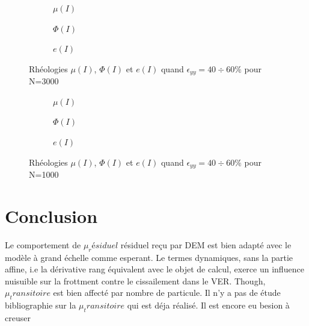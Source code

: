 \documentclass[5p,authoryear,square]{elsarticle}
\begin{document}
\begin{figure}[p]
    \centering
    \begin{subfigure}{0.3\textwidth}
        \centering
        \scalebox{0.5}{}
        \caption{$\mu(I)$}
        \label{3000_mu_I_fit}
    \end{subfigure}
    \hfill
    \begin{subfigure}{0.3\textwidth}
        \centering
        \scalebox{0.5}{}
        \caption{$\Phi(I)$}
        \label{3000_phi_I_fit}
    \end{subfigure}
    \hfill
    \begin{subfigure}{0.3\textwidth}
        \centering
        \scalebox{0.5}{}
        \caption{$e(I)$}
        \label{3000_e_I_fit}
    \end{subfigure}
    \caption{Rhéologies $\mu(I)$, $\Phi(I)$ et $e(I)$ quand $\epsilon_{yy} = 40 \div 60\%$ pour N=3000}
    \label{rheologies_3000}
\end{figure}

\begin{figure}[p]
    \centering
    \begin{subfigure}{0.3\textwidth}
        \centering
        \scalebox{0.5}{}
        \caption{$\mu(I)$}
        \label{1000_mu_I_fit}
    \end{subfigure}
    \hfill
    \begin{subfigure}{0.3\textwidth}
        \centering
        \scalebox{0.5}{}
        \caption{$\Phi(I)$}
        \label{1000_phi_I_fit}
    \end{subfigure}
    \hfill
    \begin{subfigure}{0.3\textwidth}
        \centering
        \scalebox{0.5}{}
        \caption{$e(I)$}
        \label{1000_e_I_fit}
    \end{subfigure}
    \caption{Rhéologies $\mu(I)$, $\Phi(I)$ et $e(I)$ quand $\epsilon_{yy} = 40 \div 60\%$ pour N=1000}
    \label{rheologies_1000}
\end{figure}

\section{Conclusion}\label{discussion}
Le comportement de $\mu_résiduel$ résiduel reçu par DEM est bien adapté avec le modèle à grand échelle comme esperant.
Le termes dynamiques, sans la partie affine, i.e la dérivative rang équivalent avec le objet de calcul, exerce un influence nuisuible sur la frottment contre le cissailement dans le VER.
Though, $\mu_transitoire$ est bien affecté par nombre de particule.
Il n'y a pas de étude bibliographie sur la $\mu_transitoire$ qui est déja réalisé.
Il est encore eu besion à creuser


\end{document}
